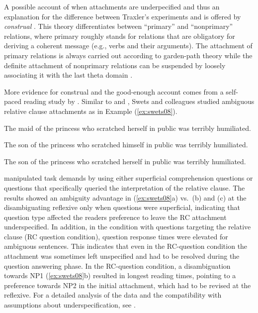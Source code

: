 \documentclass{cambridge7A}\usepackage[]{graphicx}\usepackage[]{color}
\begin{document}
A possible account of when attachments are underpecified and thus an explanation for the difference between Traxler's experiments and \cite{KemperCrowKemtes2004} is offered by  \emph{construal} \citep{CarreirasClifton1993,FrazierClifton1997}. This theory differentiates between  ``primary'' and ``nonprimary'' relations, where primary roughly stands for relations that are obligatory for deriving a coherent message (e.g., verbs and their arguments). The attachment of primary relations is always carried out according to garden-path theory \citep{Frazier1987} while the definite attachment of nonprimary relations can be suspended by loosely associating it with the last theta domain \citep{FrazierClifton1997}.

More evidence for construal and the good-enough account \citep{FerreiraFerraroBailey2002,SanfordSturt2002} comes from a self-paced reading study by \cite{SwetsDesmetClifton2008}. Similar to \cite{TraxlerPickeringClifton1998} and \cite{Traxler2007}, Swets and colleagues studied ambiguous relative clause attachments as in Example (\ref{ex:swets08}).

\begin{exe}
\ex\label{ex:swets08}
\begin{xlist}
\item The maid of the princess who scratched herself in public was terribly humiliated.
\item The son of the princess who scratched himself in public was terribly humiliated.
\item The son of the princess who scratched herself in public was terribly humiliated.
\end{xlist}
\end{exe}

\cite{SwetsDesmetClifton2008} manipulated task demands by using either superficial comprehension questions or questions that specifically queried the interpretation of the relative clause. The results showed an ambiguity advantage in (\ref{ex:swets08}a) vs.\ (b) and (c) at the disambiguating reflexive only when questions were superficial, indicating that question type affected the readers preference to leave the RC attachment underspecified. 
In addition, in the condition with questions targeting the relative clause (RC question condition), question response times were elevated for ambiguous sentences. This indicates that even in the RC-question condition the attachment was sometimes left unspecified and had to be resolved during the question answering phase. In the RC-question condition, a disambiguation towards NP1 (\ref{ex:swets08}b) resulted in longest reading times, pointing to a preference towards NP2 in the initial attachment, which had to be revised at the reflexive. For a detailed analysis of the \cite{SwetsDesmetClifton2008} data and the compatibility with assumptions about underspecification, see \cite{LogacevMultiple,LogacevVasishthQJEP2016}.
\end{document}
